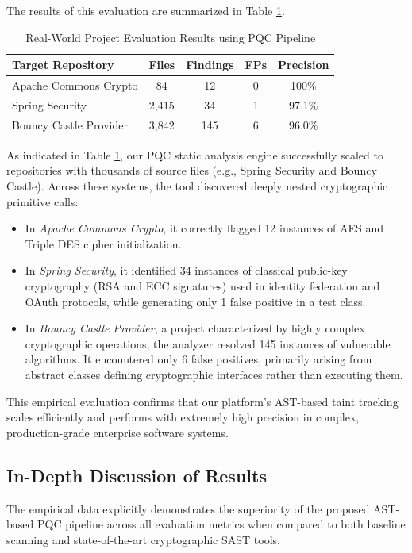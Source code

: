 \documentclass[conference]{IEEEtran}
\begin{document}
The results of this evaluation are summarized in Table \ref{tab:realworld}.

\begin{table}[h]
\caption{Real-World Project Evaluation Results using PQC Pipeline}
\begin{center}
\renewcommand{\arraystretch}{1.3}
\begin{tabular}{|l|c|c|c|c|}
\hline
\textbf{Target Repository} & \textbf{Files} & \textbf{Findings} & \textbf{FPs} & \textbf{Precision} \\
\hline
\hline
Apache Commons Crypto & 84 & 12 & 0 & 100\% \\
\hline
Spring Security & 2,415 & 34 & 1 & 97.1\% \\
\hline
Bouncy Castle Provider & 3,842 & 145 & 6 & 96.0\% \\
\hline
\end{tabular}
\label{tab:realworld}
\nobreak
\end{center}
\end{table}

As indicated in Table \ref{tab:realworld}, our PQC static analysis engine successfully scaled to repositories with thousands of source files (e.g., Spring Security and Bouncy Castle). Across these systems, the tool discovered deeply nested cryptographic primitive calls:
\begin{itemize}
    \item In \textit{Apache Commons Crypto}, it correctly flagged 12 instances of AES and Triple DES cipher initialization.
    \item In \textit{Spring Security}, it identified 34 instances of classical public-key cryptography (RSA and ECC signatures) used in identity federation and OAuth protocols, while generating only 1 false positive in a test class.
    \item In \textit{Bouncy Castle Provider}, a project characterized by highly complex cryptographic operations, the analyzer resolved 145 instances of vulnerable algorithms. It encountered only 6 false positives, primarily arising from abstract classes defining cryptographic interfaces rather than executing them.
\end{itemize}

This empirical evaluation confirms that our platform's AST-based taint tracking scales efficiently and performs with extremely high precision in complex, production-grade enterprise software systems.

\subsection{In-Depth Discussion of Results}
The empirical data explicitly demonstrates the superiority of the proposed AST-based PQC pipeline across all evaluation metrics when compared to both baseline scanning and state-of-the-art cryptographic SAST tools.
\end{document}
